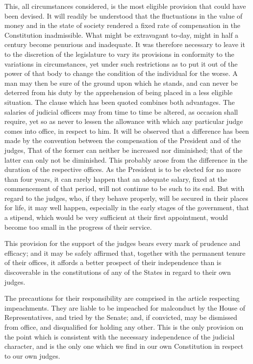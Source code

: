 This, all circumstances considered, is the most eligible provision that could have been devised. It will readily be understood that the fluctuations in the value of money and in the state of society rendered a fixed rate of compensation in the Constitution inadmissible. What might be extravagant to-day, might in half a century become penurious and inadequate. It was therefore necessary to leave it to the discretion of the legislature to vary its provisions in conformity to the variations in circumstances, yet under such restrictions as to put it out of the power of that body to change the condition of the individual for the worse. A man may then be sure of the ground upon which he stands, and can never be deterred from his duty by the apprehension of being placed in a less eligible situation. The clause which has been quoted combines both advantages. The salaries of judicial officers may from time to time be altered, as occasion shall require, yet so as never to lessen the allowance with which any particular judge comes into office, in respect to him. It will be observed that a difference has been made by the convention between the compensation of the President and of the judges, That of the former can neither be increased nor diminished; that of the latter can only not be diminished. This probably arose from the difference in the duration of the respective offices. As the President is to be elected for no more than four years, it can rarely happen that an adequate salary, fixed at the commencement of that period, will not continue to be such to its end. But with regard to the judges, who, if they behave properly, will be secured in their places for life, it may well happen, especially in the early stages of the government, that a stipend, which would be very sufficient at their first appointment, would become too small in the progress of their service.

This provision for the support of the judges bears every mark of prudence and efficacy; and it may be safely affirmed that, together with the permanent tenure of their offices, it affords a better prospect of their independence than is discoverable in the constitutions of any of the States in regard to their own judges.

The precautions for their responsibility are comprised in the article respecting impeachments. They are liable to be impeached for malconduct by the House of Representatives, and tried by the Senate; and, if convicted, may be dismissed from office, and disqualified for holding any other. This is the only provision on the point which is consistent with the necessary independence of the judicial character, and is the only one which we find in our own Constitution in respect to our own judges.


